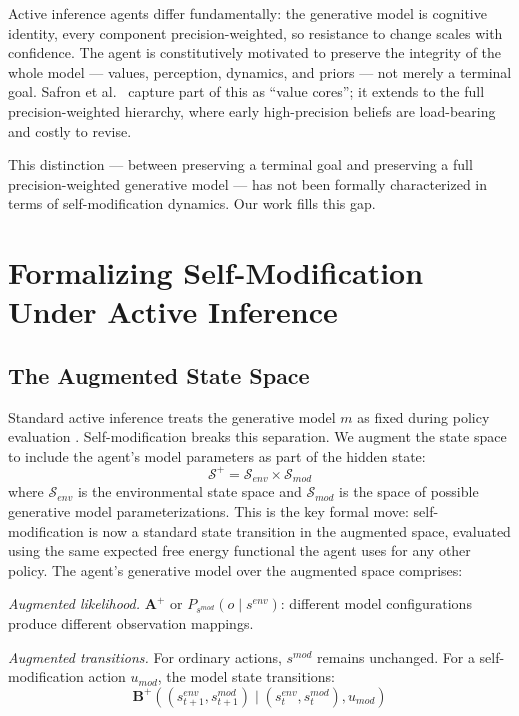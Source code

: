 \documentclass[runningheads]{llncs}
\begin{document}
Active inference agents differ fundamentally: the generative model is cognitive identity, every component precision-weighted, so resistance to change scales with confidence. The agent is constitutively motivated to preserve the integrity of the whole model --- values, perception, dynamics, and priors --- not merely a terminal goal. Safron et al.~\cite{safron2023} capture part of this as ``value cores''; it extends to the full precision-weighted hierarchy, where early high-precision beliefs are load-bearing and costly to revise.

This distinction --- between preserving a terminal goal and preserving a full precision-weighted generative model --- has not been formally characterized in terms of self-modification dynamics. Our work fills this gap.

\section{Formalizing Self-Modification Under Active Inference}

\subsection{The Augmented State Space}

Standard active inference treats the generative model $m$ as fixed during policy evaluation \cite{parr2022,friston2016}. Self-modification breaks this separation. We augment the state space to include the agent's model parameters as part of the hidden state:
\begin{equation}
\mathcal{S}^+ = \mathcal{S}_{env} \times \mathcal{S}_{mod}
\end{equation}
where $\mathcal{S}_{env}$ is the environmental state space and $\mathcal{S}_{mod}$ is the space of possible generative model parameterizations. This is the key formal move: self-modification is now a standard state transition in the augmented space, evaluated using the same expected free energy functional the agent uses for any other policy. The agent's generative model over the augmented space comprises:

\emph{Augmented likelihood.} $\mathbf{A}^+$ or $P_{s^{mod}}(o \mid s^{env})$: different model configurations produce different observation mappings.

\emph{Augmented transitions.} For ordinary actions, $s^{mod}$ remains unchanged. For a self-modification action $u_{mod}$, the model state transitions:
\begin{equation}
\mathbf{B}^+((s^{env}_{t+1}, s^{mod}_{t+1}) \mid (s^{env}_t, s^{mod}_t), u_{mod})
\end{equation}
\end{document}
